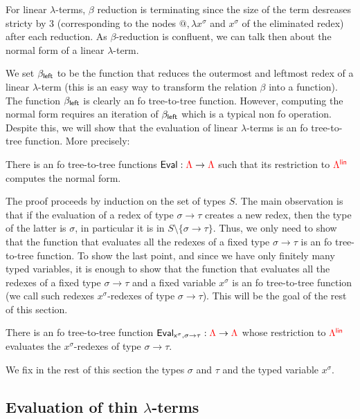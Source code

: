 \medskip
For linear $\lambda$-terms, $\beta$ reduction is terminating since the size of the term desreases stricty by 3 (corresponding to the nodes $\text{@}, \lambda x^\sigma$ and $x^\sigma$ of the eliminated redex) after each reduction. As $\beta$-reduction is confluent, we can talk then about the normal form of a linear $\lambda$-term.

\medskip
We set $\beta_{\sf{left}}$ to be the function that reduces the outermost and leftmost redex of a linear $\lambda$-term (this is an easy way to transform the relation $\beta$ into a function). The function $\beta_{\sf{left}}$  is clearly an fo tree-to-tree function. However, computing the normal form requires an iteration of $\beta_{\sf{left}}$ which is a typical non fo operation. Despite this, we will show that the evaluation of linear $\lambda$-terms is an fo tree-to-tree function. More precisely:


\begin{theorem}
There is an fo tree-to-tree functions ${\sf{Eval}}:{\color{red}{\Lambda}} \to{\color{red}{\Lambda}}$ such that its restriction to ${\color{red}{\Lambda^{\sf{lin}}}}$ computes the normal form.
\end{theorem}

The proof proceeds by induction on the set of types $S$. The main observation is that if the evaluation of a redex of type $\sigma\rightarrow \tau$ creates a new redex, then the type of the latter is $\sigma$, in particular it is in $S\setminus\{\sigma\rightarrow\tau\}$. Thus, we only need to show that the function that evaluates all the redexes of a fixed type $\sigma\rightarrow\tau$ is an fo tree-to-tree function.  To show the last point, and since we have only finitely many typed variables, it is enough to show that the function that evaluates all the redexes of a fixed type $\sigma\rightarrow\tau$ and a fixed variable $x^\sigma$ is an fo tree-to-tree function (we call such redexes $x^\sigma$-redexes of type $\sigma\rightarrow\tau$). This will be the goal of the rest of this section. 

\begin{theorem}\label{thm:evalOneType}
There is an fo tree-to-tree function ${\sf{Eval}_{x^\sigma,\sigma\rightarrow\tau}}:{\color{red}{\Lambda}} \to{\color{red}{\Lambda}}$ whose restriction to ${\color{red}{\Lambda^{\sf{lin}}}}$ evaluates the  $x^\sigma$-redexes of type $\sigma\rightarrow\tau$.
\end{theorem}

We fix in the rest of this section the types $\sigma$ and $\tau$ and the typed variable $x^\sigma$.

\subsection{Evaluation of thin $\lambda$-terms}

